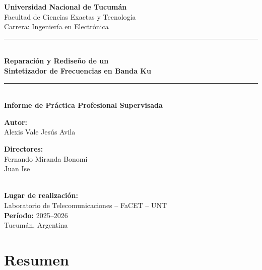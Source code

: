 \documentclass[12pt, a4paper]{article}
\begin{document}
	
	\thispagestyle{empty}
	\begin{titlepage}
		\centering
		\vspace*{0.5cm}
		
		{\Large \textbf{Universidad Nacional de Tucumán}}\\[0.3cm]
		{\large Facultad de Ciencias Exactas y Tecnología}\\[0.2cm]
		{\large Carrera: Ingeniería en Electrónica}\\[2cm]
		
		\noindent\rule{\textwidth}{1.5pt}\\[0.4cm]
		{\LARGE \textbf{Reparación y Rediseño de un\\[0.2cm]
				Sintetizador de Frecuencias en Banda Ku}}\\[0.3cm]
		\noindent\rule{\textwidth}{1.5pt}\\[1.5cm]
		
		{\large \textbf{Informe de Práctica Profesional Supervisada}}\\[2cm]
		
		\begin{minipage}[t]{0.48\textwidth}
			\raggedright
			\textbf{Autor:}\\
			Alexis Vale
			Jesús Avila
		\end{minipage}
		\hfill
		\begin{minipage}[t]{0.48\textwidth}
			\raggedleft
			\textbf{Directores:}\\
			Fernando Miranda Bonomi\\
			Juan Ise
		\end{minipage}\\[2cm]
		
		\textbf{Lugar de realización:}\\
		Laboratorio de Telecomunicaciones – FaCET – UNT\\[1cm]
		
		\textbf{Período:} 2025–2026\\[2cm]
		
		\vfill
		{\small Tucumán, Argentina}
	\end{titlepage}
	
	\newpage
	\thispagestyle{plain}
	\section*{Resumen}
	
\end{document}
